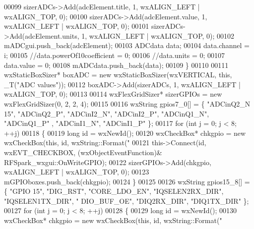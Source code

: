 \begin{DoxyCode}
{00099         sizerADCs->Add(adcElement.title, 1, wxALIGN\_LEFT | wxALIGN\_TOP, 0);
00100         sizerADCs->Add(adcElement.value, 1, wxALIGN\_LEFT | wxALIGN\_TOP, 0);
00101         sizerADCs->Add(adcElement.units, 1, wxALIGN\_LEFT | wxALIGN\_TOP, 0);
00102         mADCgui.push\_back(adcElement);
00103         ADCdata data;
00104         data.channel = i;
00105         \textcolor{comment}{//data.powerOf10coefficient = 0;}
00106         \textcolor{comment}{//data.units = 0;}
00107         data.value = 0;
00108         mADCdata.push\_back(data);
00109     \}
00110 
00111     wxStaticBoxSizer* boxADC = \textcolor{keyword}{new} wxStaticBoxSizer(wxVERTICAL, \textcolor{keyword}{this}, \_T(\textcolor{stringliteral}{"ADC values"}));
00112     boxADC->Add(sizerADCs, 1, wxALIGN\_LEFT | wxALIGN\_TOP, 0);
00113 
00114     wxFlexGridSizer* sizerGPIOs = \textcolor{keyword}{new} wxFlexGridSizer(0, 2, 2, 4);
00115 
00116     wxString gpios7\_0[] = \{ \textcolor{stringliteral}{"ADCinQ2\_N 15"}, \textcolor{stringliteral}{"ADCinQ2\_P"}, \textcolor{stringliteral}{"ADCinI2\_N"}, \textcolor{stringliteral}{"ADCinI2\_P"}, \textcolor{stringliteral}{"ADCinQ1\_N"}, \textcolor{stringliteral}{"ADCinQ1\_P"}
      , \textcolor{stringliteral}{"ADCinI1\_N"}, \textcolor{stringliteral}{"ADCinI1\_P"} \};
00117     \textcolor{keywordflow}{for} (\textcolor{keywordtype}{int} j = 0; j < 8; ++j)
00118     \{
00119         \textcolor{keywordtype}{long} \textcolor{keywordtype}{id} = wxNewId();
00120         wxCheckBox* chkgpio = \textcolor{keyword}{new} wxCheckBox(\textcolor{keyword}{this}, \textcolor{keywordtype}{id}, wxString::Format(\textcolor{stringliteral}{"%
00121         this->Connect(\textcolor{keywordtype}{id}, wxEVT\_CHECKBOX, (wxObjectEventFunction)&
      RFSpark_wxgui::OnWriteGPIO);
00122         sizerGPIOs->Add(chkgpio, wxALIGN\_LEFT | wxALIGN\_TOP, 0);
00123         mGPIOboxes.push\_back(chkgpio);
00124     \}
00125 
00126     wxString gpios15\_8[] = \{ \textcolor{stringliteral}{"GPIO 15"}, \textcolor{stringliteral}{"DIG\_RST"}, \textcolor{stringliteral}{"CORE\_LDO\_EN"}, \textcolor{stringliteral}{"IQSELEN2RX\_DIR"}, \textcolor{stringliteral}{"IQSELEN1TX\_DIR"}, \textcolor{stringliteral}{"
      DIO\_BUF\_OE"}, \textcolor{stringliteral}{"DIQ2RX\_DIR"}, \textcolor{stringliteral}{"DIQ1TX\_DIR"} \};
00127     \textcolor{keywordflow}{for} (\textcolor{keywordtype}{int} j = 0; j < 8; ++j)
00128     \{
00129         \textcolor{keywordtype}{long} \textcolor{keywordtype}{id} = wxNewId();
00130         wxCheckBox* chkgpio = \textcolor{keyword}{new} wxCheckBox(\textcolor{keyword}{this}, \textcolor{keywordtype}{id}, wxString::Format(\textcolor{stringliteral}{"%
}}}
\end{DoxyCode}

